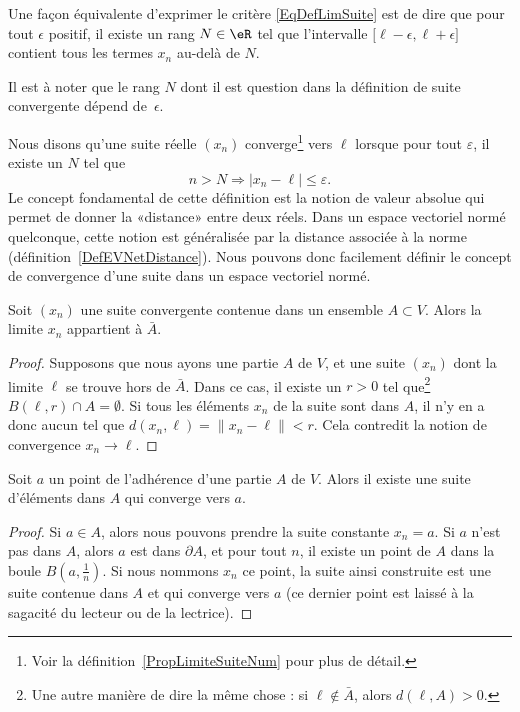 Une façon équivalente d'exprimer le critère \eqref{EqDefLimSuite} est de dire que pour tout $\epsilon$ positif, il existe un rang $N\in\eR$ tel que l'intervalle $\mathopen[ \ell-\epsilon , \ell+\epsilon \mathclose]$ contient tous les termes $x_n$ au-delà de $N$.

Il est à noter que le rang $N$ dont il est question dans la définition de suite convergente dépend de~$\epsilon$.

Nous disons qu'une suite réelle $(x_n)$ converge\footnote{Voir la définition~\ref{PropLimiteSuiteNum} pour plus de détail.} vers $\ell$ lorsque pour tout $\varepsilon$, il existe un $N$ tel que
\begin{equation}
	n>N\Rightarrow | x_n-\ell |\leq\varepsilon.
\end{equation}
Le concept fondamental de cette définition est la notion de valeur absolue qui permet de donner la «distance» entre deux réels. Dans un espace vectoriel normé quelconque, cette notion est généralisée par la distance associée à la norme (définition~\ref{DefEVNetDistance}). Nous pouvons donc facilement définir le concept de convergence d'une suite dans un espace vectoriel normé.

\begin{lemma}		\label{LemLimAbarA}
	Soit $(x_n)$ une suite convergente contenue dans un ensemble $A\subset V$. Alors la limite $x_n$ appartient à $\bar A$.
\end{lemma}

\begin{proof}
	Supposons que nous ayons une partie $A$ de $V$, et une suite $(x_n)$ dont la limite $\ell$ se trouve hors de $\bar A$. Dans ce cas, il existe un $r>0$ tel que\footnote{Une autre manière de dire la même chose : si $\ell\notin\bar A$, alors $d(\ell,A)>0$.} $B(\ell,r)\cap A=\emptyset$. Si tous les éléments $x_n$ de la suite sont dans $A$, il n'y en a donc aucun tel que $d(x_n,\ell)=\| x_n-\ell \|<r$. Cela contredit la notion de convergence $x_n\to \ell$.
\end{proof}

\begin{corollary}		\label{CorAdhEstLim}
	Soit $a$ un point de l'adhérence d'une partie $A$ de $V$. Alors il existe une suite d'éléments dans $A$ qui converge vers $a$.
\end{corollary}

\begin{proof}
	Si $a\in A$, alors nous pouvons prendre la suite constante $x_n=a$. Si $a$ n'est pas dans $A$, alors $a$ est dans $\partial A$, et pour tout $n$, il existe un point de $A$ dans la boule $B(a,\frac{1}{ n })$. Si nous nommons $x_n$ ce point, la suite ainsi construite est une suite contenue dans $A$ et qui converge vers $a$ (ce dernier point est laissé à la sagacité du lecteur ou de la lectrice).
\end{proof}

